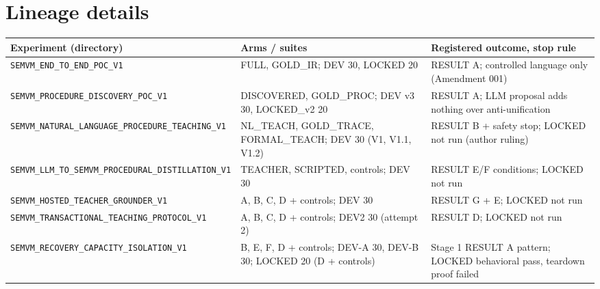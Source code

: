 \documentclass[10pt]{article}
\newcommand{\id}[1]{\nolinkurl{#1}}
\begin{document}
{\small


}

\appendix
\section{Lineage details}\label{app:lineage}
\begin{table}[h]
\centering\small
\begin{tabularx}{\linewidth}{@{}l>{\raggedright}X>{\raggedright\arraybackslash}X@{}}
\toprule
Experiment (directory) & Arms / suites & Registered outcome, stop rule \\
\midrule
\id{SEMVM_END_TO_END_POC_V1} & FULL, GOLD\_IR; DEV 30, LOCKED 20 & RESULT A; controlled language only (Amendment 001) \\
\id{SEMVM_PROCEDURE_DISCOVERY_POC_V1} & DISCOVERED, GOLD\_PROC; DEV v3 30, LOCKED\_v2 20 & RESULT A; LLM proposal adds nothing over anti-unification \\
\id{SEMVM_NATURAL_LANGUAGE_PROCEDURE_TEACHING_V1} & NL\_TEACH, GOLD\_TRACE, FORMAL\_TEACH; DEV 30 (V1, V1.1, V1.2) & RESULT B + safety stop; LOCKED not run (author ruling) \\
\id{SEMVM_LLM_TO_SEMVM_PROCEDURAL_DISTILLATION_V1} & TEACHER, SCRIPTED, controls; DEV 30 & RESULT E/F conditions; LOCKED not run \\
\id{SEMVM_HOSTED_TEACHER_GROUNDER_V1} & A, B, C, D + controls; DEV 30 & RESULT G + E; LOCKED not run \\
\id{SEMVM_TRANSACTIONAL_TEACHING_PROTOCOL_V1} & A, B, C, D + controls; DEV2 30 (attempt 2) & RESULT D; LOCKED not run \\
\id{SEMVM_RECOVERY_CAPACITY_ISOLATION_V1} & B, E, F, D + controls; DEV-A 30, DEV-B 30; LOCKED 20 (D + controls) & Stage 1 RESULT A pattern; LOCKED behavioral pass, teardown proof failed \\
\bottomrule
\end{tabularx}
\end{table}
\end{document}
